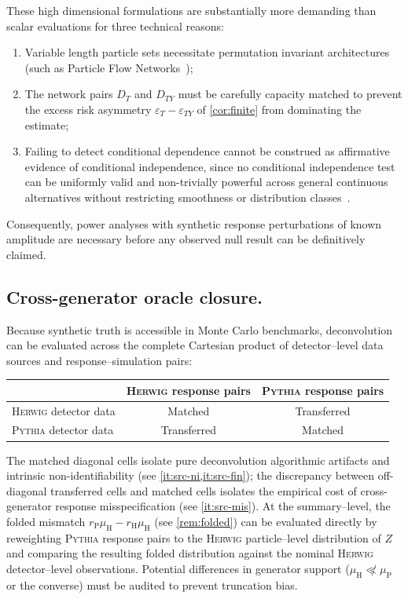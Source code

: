 \documentclass[12pt]{article}
\newcommand{\Herwig}{\mathrm{H}}
\newcommand{\Pythia}{\mathrm{P}}
\newcommand{\1}{\mathbbm{1}}
\renewcommand{\[}{\begin{equation}}
\renewcommand{\]}{\end{equation}}
\begin{document}
    These high dimensional formulations are substantially more demanding than scalar evaluations for three technical reasons:
    \begin{enumerate}
        \item Variable length particle sets necessitate permutation invariant architectures (such as Particle Flow Networks~\cite{Komiske:2018cqr});
        \item The network pairs \(D_T\) and \(D_{TY}\) must be carefully capacity matched to prevent the excess risk asymmetry \(\varepsilon_T - \varepsilon_{TY}\) of \cref{cor:finite} from dominating the estimate;
        \item Failing to detect conditional dependence cannot be construed as affirmative evidence of conditional independence, since no conditional independence test can be uniformly valid and non-trivially powerful across general continuous alternatives without restricting smoothness or distribution classes~\cite{ShahPeters:2020}.
    \end{enumerate}
    Consequently, power analyses with synthetic response perturbations of known amplitude are necessary before any observed null result can be definitively claimed.

    \subsection{Cross-generator oracle closure.}
    \label{sec:closure-matrix}

    Because synthetic truth is accessible in Monte Carlo benchmarks, deconvolution can be evaluated across the complete Cartesian product of detector--level data sources and response--simulation pairs:
    \begin{center}
    \begin{tabular}{lcc}
        \toprule
        & \textsc{Herwig} response pairs & \textsc{Pythia} response pairs\\
        \midrule
        \textsc{Herwig} detector data & Matched & Transferred\\
        \textsc{Pythia} detector data & Transferred & Matched\\
        \bottomrule
    \end{tabular}
    \end{center}
    
    The matched diagonal cells isolate pure deconvolution algorithmic artifacts and intrinsic non-identifiability (see \cref{it:src-ni,it:src-fin}); the discrepancy between off-diagonal transferred cells and matched cells isolates the empirical cost of cross-generator response misspecification (see \cref{it:src-mis}).
    At the summary--level, the folded mismatch \(r_\Pythia\mu_\Herwig - r_\Herwig\mu_\Herwig\) (see \cref{rem:folded}) can be evaluated directly by reweighting \textsc{Pythia} response pairs to the \textsc{Herwig} particle--level distribution of \(Z\) and comparing the resulting folded distribution against the nominal \textsc{Herwig} detector--level observations.
    Potential differences in generator support (\(\mu_\Herwig \not\ll \mu_\Pythia\) or the converse) must be audited to prevent truncation bias.
\end{document}
